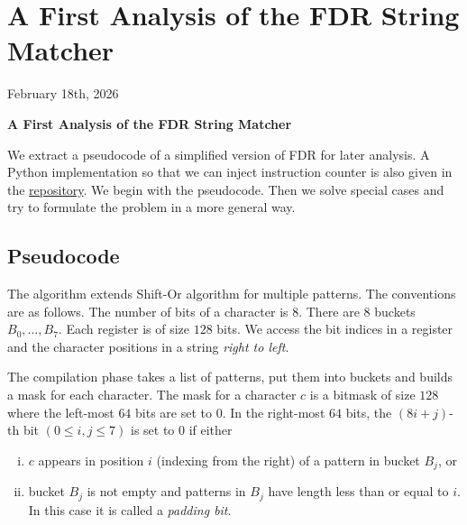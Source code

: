 \chapter{A First Analysis of the FDR String Matcher}

\begin{center}
  February 18th, 2026
  \vspace{0.5cm}
\end{center}

\begin{center}
  \vspace{1em}
  \textbf{\Large A First Analysis of the FDR String Matcher}\\
  \vspace{1em}
\end{center}

We extract a pseudocode of a simplified version of FDR for later analysis. A Python implementation so that we can inject instruction counter is also given in the \href{https://github.com/mintcd/string-matchers/tree/main/src/py_fdr}{repository}. We begin with the pseudocode. Then we solve special cases and try to formulate the problem in a more general way.

\section{Pseudocode}

The algorithm extends Shift-Or algorithm for multiple patterns. The conventions are as follows. The number of bits of a character is $8$. There are $8$ buckets $B_0, \ldots, B_7$. Each register is of size $128$ bits. We access the bit indices in a register and the character positions in a string \textit{right to left}.

The compilation phase takes a list of patterns, put them into buckets and builds a mask for each character. The mask for a character $c$ is a bitmask of size $128$ where the left-most $64$ bits are set to $0$. In the right-most $64$ bits, the $(8i+j)$-th bit $(0\le i,j\le 7)$ is set to $0$ if either

\begin{enumerate}[(i)]
  \item $c$ appears in position $i$ (indexing from the right) of a pattern in bucket $B_j$, or
  \item bucket $B_j$ is not empty and patterns in $B_j$ have length less than or equal to $i$. In this case it is called a \textit{padding bit}.
\end{enumerate}

